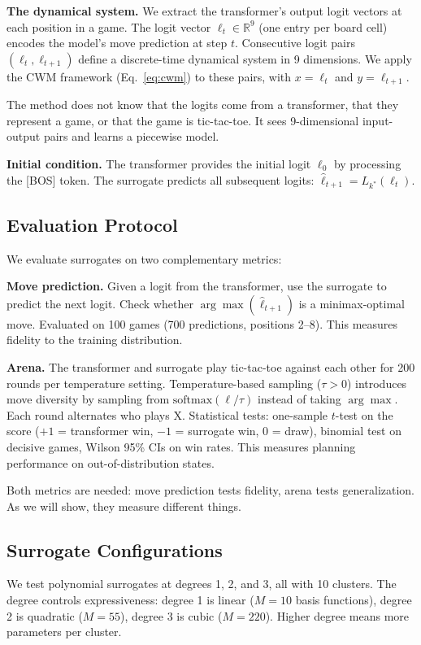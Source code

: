 \documentclass[11pt]{article}
\theoremstyle{definition}
\newcommand{\R}{\mathbb{R}}
\begin{document}
\textbf{The dynamical system.} We extract the transformer's output logit vectors at each position in a game. The logit vector $\ell_t \in \R^9$ (one entry per board cell) encodes the model's move prediction at step $t$. Consecutive logit pairs $(\ell_t, \ell_{t+1})$ define a discrete-time dynamical system in 9 dimensions. We apply the CWM framework (Eq.~\ref{eq:cwm}) to these pairs, with $x = \ell_t$ and $y = \ell_{t+1}$.

The method does not know that the logits come from a transformer, that they represent a game, or that the game is tic-tac-toe. It sees 9-dimensional input-output pairs and learns a piecewise model.

\textbf{Initial condition.} The transformer provides the initial logit $\ell_0$ by processing the [BOS] token. The surrogate predicts all subsequent logits: $\hat{\ell}_{t+1} = L_{k^*}(\ell_t)$.

\subsection{Evaluation Protocol}

We evaluate surrogates on two complementary metrics:

\textbf{Move prediction.} Given a logit from the transformer, use the surrogate to predict the next logit. Check whether $\arg\max(\hat{\ell}_{t+1})$ is a minimax-optimal move. Evaluated on 100 games (700 predictions, positions 2--8). This measures fidelity to the training distribution.

\textbf{Arena.} The transformer and surrogate play tic-tac-toe against each other for 200 rounds per temperature setting. Temperature-based sampling ($\tau > 0$) introduces move diversity by sampling from $\mathrm{softmax}(\ell / \tau)$ instead of taking $\arg\max$. Each round alternates who plays X. Statistical tests: one-sample $t$-test on the score ($+1$ = transformer win, $-1$ = surrogate win, $0$ = draw), binomial test on decisive games, Wilson 95\% CIs on win rates. This measures planning performance on out-of-distribution states.

Both metrics are needed: move prediction tests fidelity, arena tests generalization. As we will show, they measure different things.

\subsection{Surrogate Configurations}

We test polynomial surrogates at degrees 1, 2, and 3, all with 10 clusters. The degree controls expressiveness: degree 1 is linear ($M=10$ basis functions), degree 2 is quadratic ($M=55$), degree 3 is cubic ($M=220$). Higher degree means more parameters per cluster.
\end{document}
